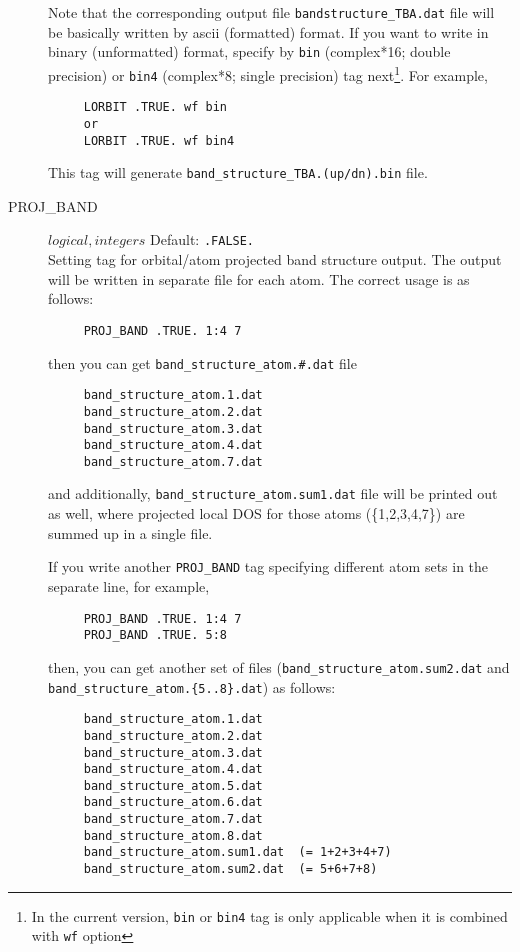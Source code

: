 \documentclass[a4paper,12pt]{scrartcl}
\makeatletter
\def\namedlabel#1#2{\begingroup
    #2%
    \def\@currentlabel{#2}%
    \phantomsection\label{#1}\endgroup
}
\newcommand{\textblue}[1]{\textcolor{blue!85!white}{\texttt{#1}}}
\makeatother
\begin{document}
\begin{description}
        Note that the corresponding output file \texttt{bandstructure\_TBA.dat} file will be basically 
        written by ascii (formatted) format. If you want to write in binary (unformatted) format,
        specify by \texttt{bin} (complex*16; double precision) or \texttt{bin4} (complex*8; single precision) tag next\footnote{In the current version, \texttt{bin} or \texttt{bin4} tag is only applicable when it is combined with \texttt{wf} option}. For example,

    \begin{verbatim}
     LORBIT .TRUE. wf bin
     or
     LORBIT .TRUE. wf bin4
    \end{verbatim}
    
        This tag will generate \texttt{band\_structure\_TBA.(up/dn).}\textblue{bin} file.
        
    \item[\namedlabel{tag:PROJBAND}{PROJ\_BAND}] $logical, integers$ Default: \texttt{.FALSE.} \\
		Setting tag for orbital/atom projected band structure output. The output will be written in separate file for each atom. The correct usage is as follows: 
    \begin{verbatim}
     PROJ_BAND .TRUE. 1:4 7
    \end{verbatim}
    then you can get \texttt{band\_structure\_atom.\#.dat} file \\
    
        \begin{verbatim}
     band_structure_atom.1.dat
     band_structure_atom.2.dat
     band_structure_atom.3.dat
     band_structure_atom.4.dat
     band_structure_atom.7.dat
    \end{verbatim} 
    and additionally, \texttt{band\_structure\_atom.sum1.dat}     
    file will be printed out as well, where projected local DOS for those atoms (\{1,2,3,4,7\}) are summed up in a single file.
    
    If you write another \texttt{PROJ\_BAND} tag specifying different atom sets in the separate line,
    for example, 
    
    \begin{verbatim}
     PROJ_BAND .TRUE. 1:4 7
     PROJ_BAND .TRUE. 5:8
    \end{verbatim}
    
    then, you can get another set of files (\texttt{band\_structure\_atom.sum2.dat} and \\
    \texttt{band\_structure\_atom.\{5..8\}.dat}) as follows:
    \begin{verbatim}
     band_structure_atom.1.dat
     band_structure_atom.2.dat
     band_structure_atom.3.dat
     band_structure_atom.4.dat
     band_structure_atom.5.dat
     band_structure_atom.6.dat
     band_structure_atom.7.dat
     band_structure_atom.8.dat
     band_structure_atom.sum1.dat  (= 1+2+3+4+7) 
     band_structure_atom.sum2.dat  (= 5+6+7+8)
    \end{verbatim} 
       

\end{description}
\end{document}
